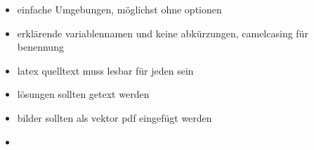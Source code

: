 \documentclass[a4paper, fleqn, 10pt]{article}
\begin{document}
  \begin{itemize}
    \item einfache Umgebungen, möglichst ohne optionen
    \item erklärende variablennamen und keine abkürzungen, camelcasing für benennung
    \item latex quelltext muss lesbar für jeden sein
    \item lösungen sollten getext werden
    \item bilder sollten als vektor pdf eingefügt werden
    \item
  \end{itemize}
\end{document}
